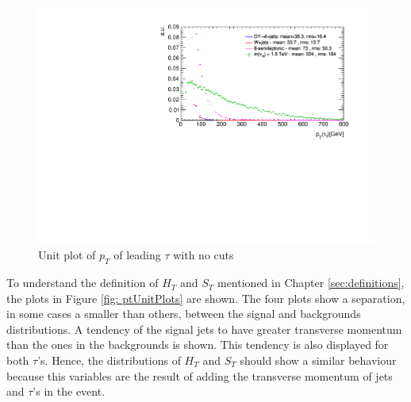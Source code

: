 \begin{figure}
\centering
\includegraphics[width=\linewidth]{Plots/tau1_pt_unitNC.pdf}
\caption{Unit plot of $p_{T}$ of leading $\tau$ with no cuts}
\label{fig: tau1ptunitNC}
\end{figure}

To understand the definition of $H_{T}$ and $S_{T}$ mentioned in Chapter \ref{sec:definitions}, the plots in Figure \ref{fig: ptUnitPlots} are shown. The four plots show a separation, in some cases a smaller than others, between the signal and backgrounds distributions. A tendency of the signal jets to have greater transverse momentum than the ones in the backgrounds is shown. This tendency is also displayed for both $\tau$'s. Hence, the distributions of $H_{T}$ and $S_{T}$ should show a similar behaviour because this variables are the result of adding the transverse momentum of jets and $\tau$'s in the event.


